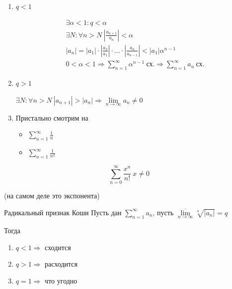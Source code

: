 \begin{enumerate}
    \item
        \( q < 1 \)

        \begin{gather*}
            \exists \alpha < 1 : q < \alpha
            \\
            \exists N : \forall n > N \ \left| \frac{a_{n + 1}}{a_n} \right| < \alpha
            \\
            |a_n| 
                = |a_1| \cdot \left| \frac{a_2}{a_1} \right| \cdot \ldots \cdot \left| \frac{a_n}{a_{n - 1}} \right| 
                < |a_1| \alpha^{n - 1}
            \\
            0 < \alpha < 1 \Rightarrow \sum\limits_{n = 1}^{\infty} \alpha^{n - 1} \ \text{сх.}
                \Rightarrow \sum\limits_{n = 1}^{\infty} a_n \ \text{сх.}
        \end{gather*}
    \item
        \( q > 1 \)

        \( \exists N : \forall n > N \ |a_{n + 1}| > |a_n| \Rightarrow \lim\limits_{n \to \infty} a_n \neq 0 \)
    \item
        Пристально смотрим на
        \begin{itemize}
            \item
                \( \sum\limits_{n = 1}^{\infty} \frac{1}{n} \)
            \item
                \( \sum\limits_{n = 1}^{\infty} \frac{1}{n^2} \)
        \end{itemize}
\end{enumerate}


\begin{example}{}{}
    \[
        \sum\limits_{n = 0}^{\infty} \frac{x^n}{n!} \ x \neq 0
    \]
    
    (на самом деле это экспонента)
\end{example}

\begin{thrm}{Радикальный признак Коши}{}
    Пусть дан \( \sum\limits_{n = 1}^{\infty} a_n \), пусть \( \overline{\lim\limits_{n \to \infty}} \sqrt[n]{|a_n|} = q \)

    Тогда
    \begin{enumerate}
        \item
            \( q < 1 \Rightarrow \) сходится
        \item
            \( q > 1 \Rightarrow \) расходится
        \item
            \( q = 1 \Rightarrow \) что угодно
    \end{enumerate}
\end{thrm}

